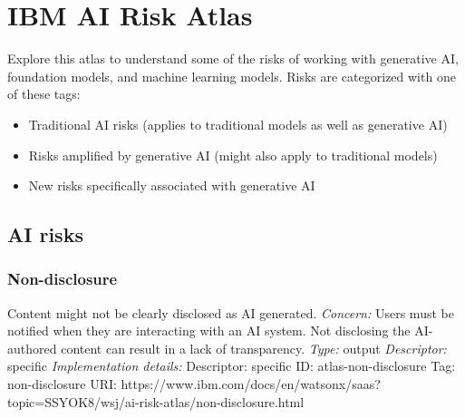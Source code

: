 \documentclass{article}
\begin{document}
\section{IBM AI Risk Atlas}
Explore this atlas to understand some of the risks of working with generative AI, foundation models, and machine learning models. Risks are categorized with one of these tags:
\begin{itemize}
\item Traditional AI risks (applies to traditional models as well as generative AI)
\item Risks amplified by generative AI (might also apply to traditional models)
\item New risks specifically associated with generative AI
\end{itemize}
\subsection*{AI risks}
\subsubsection*{Non-disclosure}
Content might not be clearly disclosed as AI generated.\newline
\textit{Concern: }Users must be notified when they are interacting with an AI system. Not disclosing the AI-authored content can result in a lack of transparency.\newline\newline
\textit{Type: }output\newline
\textit{Descriptor: }specific \newline\newline
\textit{Implementation details:} \newline
Descriptor: specific \newline
ID: atlas-non-disclosure \newline
Tag: non-disclosure \newline
URI:  https://www.ibm.com/docs/en/watsonx/saas?topic=SSYOK8/wsj/ai-risk-atlas/non-disclosure.html\newline
\end{document}
